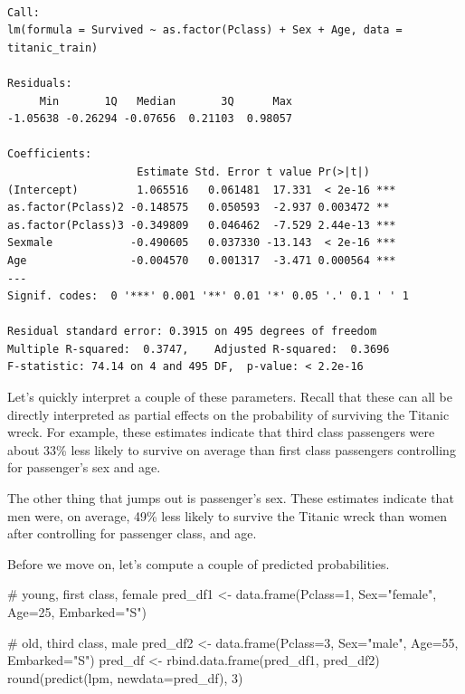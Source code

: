 \documentclass[
  letterpaper,
  DIV=11,
  numbers=noendperiod]{scrreprt}
\newenvironment{Shaded}{\begin{snugshade}}{\end{snugshade}}
\newcommand{\AttributeTok}[1]{\textcolor[rgb]{0.40,0.45,0.13}{#1}}
\newcommand{\CommentTok}[1]{\textcolor[rgb]{0.37,0.37,0.37}{#1}}
\newcommand{\DecValTok}[1]{\textcolor[rgb]{0.68,0.00,0.00}{#1}}
\newcommand{\FunctionTok}[1]{\textcolor[rgb]{0.28,0.35,0.67}{#1}}
\newcommand{\NormalTok}[1]{\textcolor[rgb]{0.00,0.23,0.31}{#1}}
\newcommand{\OtherTok}[1]{\textcolor[rgb]{0.00,0.23,0.31}{#1}}
\newcommand{\StringTok}[1]{\textcolor[rgb]{0.13,0.47,0.30}{#1}}
\begin{document}
\begin{verbatim}

Call:
lm(formula = Survived ~ as.factor(Pclass) + Sex + Age, data = titanic_train)

Residuals:
     Min       1Q   Median       3Q      Max 
-1.05638 -0.26294 -0.07656  0.21103  0.98057 

Coefficients:
                    Estimate Std. Error t value Pr(>|t|)    
(Intercept)         1.065516   0.061481  17.331  < 2e-16 ***
as.factor(Pclass)2 -0.148575   0.050593  -2.937 0.003472 ** 
as.factor(Pclass)3 -0.349809   0.046462  -7.529 2.44e-13 ***
Sexmale            -0.490605   0.037330 -13.143  < 2e-16 ***
Age                -0.004570   0.001317  -3.471 0.000564 ***
---
Signif. codes:  0 '***' 0.001 '**' 0.01 '*' 0.05 '.' 0.1 ' ' 1

Residual standard error: 0.3915 on 495 degrees of freedom
Multiple R-squared:  0.3747,    Adjusted R-squared:  0.3696 
F-statistic: 74.14 on 4 and 495 DF,  p-value: < 2.2e-16
\end{verbatim}

Let's quickly interpret a couple of these parameters. Recall that these
can all be directly interpreted as partial effects on the probability of
surviving the Titanic wreck. For example, these estimates indicate that
third class passengers were about 33\% less likely to survive on average
than first class passengers controlling for passenger's sex and age.

The other thing that jumps out is passenger's sex. These estimates
indicate that men were, on average, 49\% less likely to survive the
Titanic wreck than women after controlling for passenger class, and age.

Before we move on, let's compute a couple of predicted probabilities.

\begin{Shaded}
\begin{Highlighting}[]
\CommentTok{\# young, first class, female}
\NormalTok{pred\_df1 }\OtherTok{\textless{}{-}} \FunctionTok{data.frame}\NormalTok{(}\AttributeTok{Pclass=}\DecValTok{1}\NormalTok{, }\AttributeTok{Sex=}\StringTok{"female"}\NormalTok{, }\AttributeTok{Age=}\DecValTok{25}\NormalTok{, }\AttributeTok{Embarked=}\StringTok{"S"}\NormalTok{)}

\CommentTok{\# old, third class, male}
\NormalTok{pred\_df2 }\OtherTok{\textless{}{-}} \FunctionTok{data.frame}\NormalTok{(}\AttributeTok{Pclass=}\DecValTok{3}\NormalTok{, }\AttributeTok{Sex=}\StringTok{"male"}\NormalTok{, }\AttributeTok{Age=}\DecValTok{55}\NormalTok{, }\AttributeTok{Embarked=}\StringTok{"S"}\NormalTok{)}
\NormalTok{pred\_df }\OtherTok{\textless{}{-}} \FunctionTok{rbind.data.frame}\NormalTok{(pred\_df1, pred\_df2)}
\FunctionTok{round}\NormalTok{(}\FunctionTok{predict}\NormalTok{(lpm, }\AttributeTok{newdata=}\NormalTok{pred\_df), }\DecValTok{3}\NormalTok{)}
\end{Highlighting}
\end{Shaded}
\end{document}
